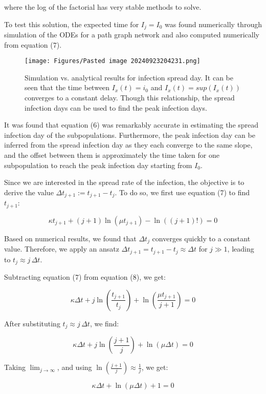 where the log of the factorial has very stable methods to solve\cite{C}.

To test this solution, the expected time for $I_j = I_0$ was found numerically through simulation of the ODEs for a path graph network and also computed numerically from equation (7).

\begin{figure}[!ht]
    \centering
    \texttt{[image: Figures/Pasted image 20240923204231.png]}
    \caption{\small Simulation vs. analytical results for infection spread day. It can be seen that the time between $I_x(t)=i_0$ and $I_x(t)=sup(I_x(t))$ converges to a constant delay. Though this relationship, the spread infection days can be used to find the peak infection days.}
\end{figure}

It was found that equation (6) was remarkably accurate in estimating the spread infection day of the subpopulations. Furthermore, the peak infection day can be inferred from the spread infection day as they each converge to the same slope, and the offset between them is approximately the time taken for one subpopulation to reach the peak infection day starting from $I_0$.

Since we are interested in the spread rate of the infection, the objective is to derive the value ${\Delta t}_{j+1} := t_{j+1}-t_j$. To do so, we first use equation (7) to find $t_{j+1}$:

$$
\kappa t_{j+1} + (j+1) \ln(\mu t_{j+1}) - \ln((j+1)!) = 0 
$$

Based on numerical results, we found that ${\Delta t}_{j}$ converges quickly to a constant value. Therefore, we apply an ansatz ${\Delta t}_{j+1} = t_{j+1} - t_j \approx {\Delta t}$ for $j \gg 1$, leading to $t_j \approx j \, \Delta t$.

Subtracting equation (7) from equation (8), we get:

$$
\kappa \Delta t + j \ln\left( \frac{t_{j+1}}{t_j} \right) + \ln\left( \frac{\mu t_{j+1}}{j+1} \right) = 0
$$

After substituting $t_j \approx j \, \Delta t$, we find:

$$
\kappa \Delta t + j \ln\left( \frac{j+1}{j} \right) + \ln\left( \mu \Delta t \right) = 0 
$$

Taking $\lim_{j \to \infty}$, and using $\ln\left( \frac{{j+1}}{j} \right) \approx \frac{1}{j}$, we get:

$$
\kappa \Delta t + \ln( \mu \Delta t ) + 1 = 0
$$

